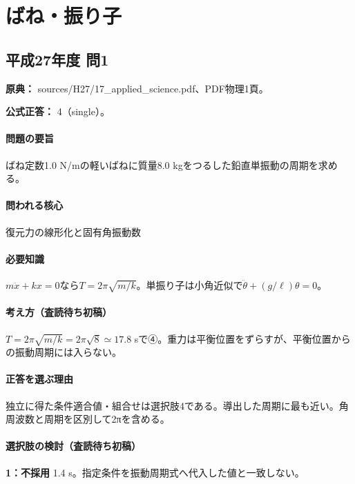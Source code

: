 \section{ばね・振り子}

\subsection{平成27年度 問1}
\label{q:h27-reg-applied-01}

\noindent\textbf{原典：} sources/H27/17\_applied\_science.pdf、PDF物理1頁。

\textbf{公式正答：} 4（single）。

\paragraph{問題の要旨} ばね定数1.0 N/mの軽いばねに質量8.0 kgをつるした鉛直単振動の周期を求める。

\paragraph{問われる核心} 復元力の線形化と固有角振動数

\paragraph{必要知識} \(m\ddot x+kx=0\)なら\(T=2\pi\sqrt{m/k}\)。単振り子は小角近似で\(\ddot\theta+(g/\ell)\theta=0\)。

\paragraph{考え方（査読待ち初稿）} \(T=2\pi\sqrt{m/k}=2\pi\sqrt8\simeq17.8\) sで④。重力は平衡位置をずらすが、平衡位置からの振動周期には入らない。

\paragraph{正答を選ぶ理由} 独立に得た条件適合値・組合せは選択肢4である。導出した周期に最も近い。角周波数と周期を区別して2πを含める。

\paragraph{選択肢の検討（査読待ち初稿）}

\noindent\textbf{1：不採用} 1.4 s。指定条件を振動周期式へ代入した値と一致しない。\par

